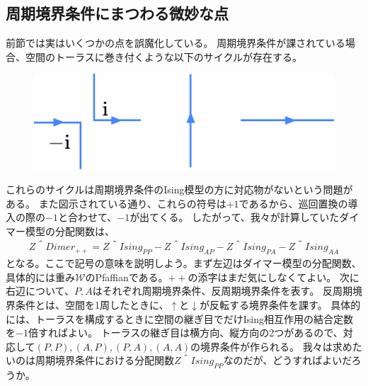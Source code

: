 \documentclass[12pt]{ltjsarticle}
\begin{document}
\subsection*{周期境界条件にまつわる微妙な点}
前節では実はいくつかの点を誤魔化している。
周期境界条件が課されている場合、空間のトーラスに巻き付くような以下のサイクルが存在する。
\begin{figure}[H]
    \centering
    \includegraphics[width=0.4\hsize]{nontrivial_cycles.pdf}
\end{figure}
これらのサイクルは周期境界条件のIsing模型の方に対応物がないという問題がある。
また図示されている通り、これらの符号は$+1$であるから、巡回置換の導入の際の$-1$と合わせて、$-1$が出てくる。
したがって、我々が計算していたダイマー模型の分配関数は、
\begin{align}
    Z＾{Dimer}_{++} = Z＾{Ising}_{𝑃𝑃} - Z＾{Ising}_{𝐴𝑃} - Z＾{Ising}_{𝑃𝐴} - Z＾{Ising}_{𝐴𝐴}
\end{align}
となる。ここで記号の意味を説明しよう。まず左辺はダイマー模型の分配関数、具体的には重み$𝒲$のPfaffianである。$++$の添字はまだ気にしなくてよい。
次に右辺について、$𝑃, 𝐴$はそれぞれ周期境界条件、反周期境界条件を表す。
反周期境界条件とは、空間を1周したときに、$↑$と$↓$が反転する境界条件を課す。
具体的には、トーラスを構成するときに空間の継ぎ目でだけIsing相互作用の結合定数を$-1$倍すればよい。
トーラスの継ぎ目は横方向、縦方向の2つがあるので、対応して$(𝑃,𝑃), (𝐴,𝑃), (𝑃, 𝐴), (𝐴, 𝐴)$の境界条件が作られる。
我々は求めたいのは周期境界条件における分配関数$Z＾{Ising}_{𝑃𝑃}$なのだが、どうすればよいだろうか。
\end{document}
